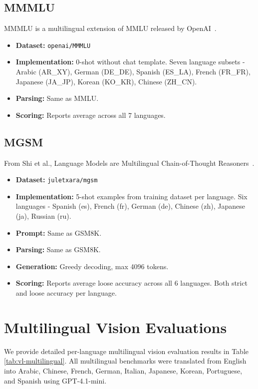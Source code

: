 \documentclass{article}
\begin{document}
\subsection*{MMMLU}

MMMLU is a multilingual extension of MMLU released by OpenAI~\citep{openai2024mmmlu}.

\begin{itemize}
    \item \textbf{Dataset:} \texttt{openai/MMMLU}
    \item \textbf{Implementation:} 0-shot without chat template. Seven language subsets - Arabic (AR\_XY), German (DE\_DE), Spanish (ES\_LA), French (FR\_FR), Japanese (JA\_JP), Korean (KO\_KR), Chinese (ZH\_CN).
    \item \textbf{Parsing:} Same as MMLU.
    \item \textbf{Scoring:} Reports average across all 7 languages.
\end{itemize}

\subsection*{MGSM}

From Shi et al., Language Models are Multilingual Chain-of-Thought Reasoners~\citep{shi2023mgsm}.

\begin{itemize}
    \item \textbf{Dataset:} \texttt{juletxara/mgsm}
    \item \textbf{Implementation:} 5-shot examples from training dataset per language. Six languages - Spanish (es), French (fr), German (de), Chinese (zh), Japanese (ja), Russian (ru).
    \item \textbf{Prompt:} Same as GSM8K.
    \item \textbf{Parsing:} Same as GSM8K.
    \item \textbf{Generation:} Greedy decoding, max 4096 tokens.
    \item \textbf{Scoring:} Reports average loose accuracy across all 6 languages. Both strict and loose accuracy per language.
\end{itemize}

\clearpage
\section{Multilingual Vision Evaluations}
\label{app:vl-multilingual}

We provide detailed per-language multilingual vision evaluation results in Table \ref{tab:vl-multilingual}. All multilingual benchmarks were translated from English into Arabic, Chinese, French, German, Italian, Japanese, Korean, Portuguese, and Spanish using GPT-4.1-mini.
\end{document}
